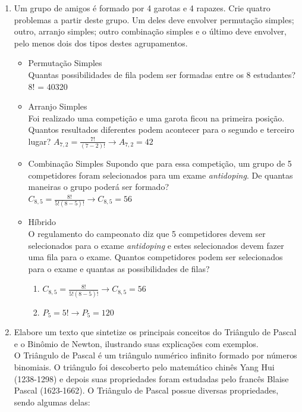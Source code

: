 \documentclass[a4paper, 12pt]{article}
\begin{document}
\begin{enumerate}
\item Um grupo de amigos é formado por 4 garotas e 4 rapazes. Crie quatro problemas a partir deste grupo. Um deles deve envolver permutação simples; outro, arranjo simples; outro combinação simples e o último deve envolver, pelo menos dois dos tipos destes agrupamentos.\\
  \begin{itemize}
  \item Permutação Simples \\
    Quantas possibilidades de fila podem ser formadas entre os 8 estudantes?\\
    8! = 40320
  \item Arranjo Simples \\
    Foi realizado uma competição e uma garota ficou na primeira posição. Quantos resultados diferentes podem acontecer para o segundo e terceiro lugar?
    $A_{7,2}=\frac{7!}{(7-2)!}\rightarrow
     A_{7,2}=42$
   \item Combinação Simples
     Supondo que para essa competição, um grupo de 5 competidores foram selecionados para um exame \emph{antidoping}. De quantas maneiras o grupo poderá ser formado?\\
     $C_{8,5}=\frac{8!}{5!(8-5)!}\rightarrow
      C_{8,5}=56$
    \item Híbrido \\
      O regulamento do campeonato diz que 5 competidores devem ser selecionados para o exame \emph{antidoping} e estes selecionados devem fazer uma fila para o exame. Quantos competidores podem ser selecionados para o exame e quantas as possibilidades de filas?
      \begin{enumerate}
        \item $C_{8,5}=\frac{8!}{5!(8-5)!}\rightarrow
          C_{8,5}=56$
        \item $P_{5}=5!\rightarrow
              P_{5}=120$        
      \end{enumerate}
  \end{itemize}
\item Elabore um texto que sintetize os principais conceitos do Triângulo de Pascal e o Binômio de Newton, ilustrando suas explicações com exemplos.\\
 O Triângulo de Pascal é um triângulo numérico infinito formado por números binomiais. O triângulo foi descoberto pelo matemático chinês Yang Hui (1238-1298)
e depois suas propriedades foram estudadas pelo francês Blaise Pascal (1623-1662). O Triângulo de Pascal possue diversas propriedades, sendo algumas delas:\\

\end{enumerate}
\end{document}
